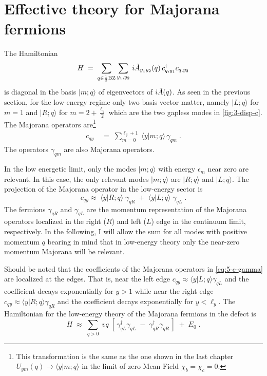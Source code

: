 \section{Effective theory for Majorana fermions}
The Hamiltonian 
\begin{equation}
    H \; = \; \sum_{q \in \frac{1}{2}\text{BZ}} \sum_{y_1,y_2} \, \dot{\imath} \tilde{A}_{y_1y_2}(q) \, c_{q,y_1}^{\dagger} c_{q,y_2} 
\end{equation}
is diagonal in the basis $\vert m; q  \rangle$ of eigenvectors of $\dot{\imath} \tilde{A}(q)$. As seen in the previous section, for the low-energy regime only two basis vector matter, namely $\vert L; q  \rangle $ for  $m=1$ and $\vert R; q  \rangle $ for  $m=2+\frac{\ell_y}{2}$ which are the two gapless modes in \ref{fig:3-disp-c}. The Majorana operators are\footnote{This transformation is the same as the one shown in the last chapter $U_{ym}(q) \to \langle y \vert m; q  \rangle$ in the limit of zero Mean Field $\chi_b=\chi_c=0$.}
\begin{align}
    c_{qy} \; & = \; \sum_{m=0}^{\ell_y+1} \; \langle y \vert m; q  \rangle \, \gamma_{qm} \; .
\end{align}
The operators $\gamma_{qm}$ are also Majorana operators.


In the low energetic limit, only the modes $\vert m ;q \rangle$ with energy $\epsilon_m$ near zero are relevant. In this case, the only relevant modes $\vert m ;q\rangle$  are $\vert R; q  \rangle$ and $\vert L; q  \rangle$. The projection of the  Majorana operator in the low-energy sector is
\begin{equation}
    c_{qy}  \approx \; \langle y \vert R; q  \rangle \;  \gamma_{qR} \; + \;   \langle y \vert L; q  \rangle \;  \gamma_{qL} \; . \label{eq:5-c-gamma}
\end{equation}
The fermions $\gamma_{qR}$ and $\gamma_{qL}$ are the momentum representation of the Majorana operators localized in the right ($R$) and left ($L$) edge in the continuum limit, respectively. In the following, I will allow the sum for all modes with positive momentum $q$ bearing in mind that in low-energy theory only the near-zero momentum Majorana will be relevant. 

Should be noted that the coefficients of the Majorana operators in \eqref{eq:5-c-gamma} are localized at the edges. That is, near the left edge $c_{qy}  \approx \langle y \vert L; q  \rangle \gamma_{qL}$  and the coefficient decays exponentially for $y > 1$ while near the right edge $c_{qy}  \approx \langle y \vert R; q  \rangle \gamma_{qR}$  and the coefficient decays exponentially for $y < \ell_y$. %
The Hamiltonian for the low-energy theory of the Majorana fermions in the defect is 
\begin{equation}
    H \; \approx \; \sum_{q >0} \; v q \; \left[ \, \gamma_{qL}^{\dagger}\gamma_{qL} \; - \; \gamma_{qR}^{\dagger}\gamma_{qR}   \, \right] \; + \; E_0 \; .
\end{equation}

